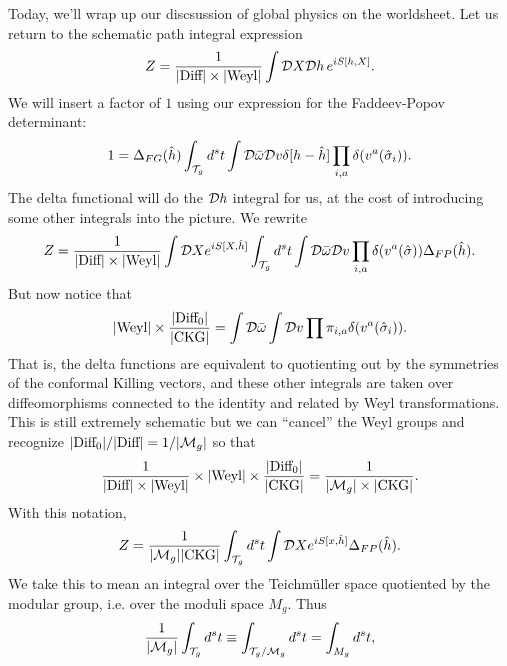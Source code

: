 Today, we'll wrap up our discsussion of global physics on the worldsheet. Let us return to the schematic path integral expression
\begin{equation}
    Z=\frac{1}{\lvert\text{Diff}\rvert \times \lvert\text{Weyl}\rvert} \int \mathcal{D} X \mathcal{D} h \, e^{iS[h,X]}.
\end{equation}
We will insert a factor of $1$ using our expression for the Faddeev-Popov determinant:
\begin{equation}
    1=\Delta_{FG}(\hat h) \int_{\mathcal{T}_g} d^s t \int \mathcal{D} \bar \omega \mathcal{D} v \delta[h-\hat h] \prod_{i,a} \delta(v^a (\hat \sigma_i)).
\end{equation}
The delta functional will do the $\mathcal{D} h$ integral for us, at the cost of introducing some other integrals into the picture. We rewrite
\begin{equation}
    Z=\frac{1}{\lvert\text{Diff}\rvert \times \lvert\text{Weyl}\rvert} \int \mathcal{D} X e^{iS[X,\hat h]} \int_{\mathcal{T}_g} d^st \int \mathcal{D} \bar \omega \mathcal{D} v \prod_{i,a} \delta(v^a (\hat \sigma)) \Delta_{FP}(\hat h).
\end{equation}
But now notice that
\begin{equation*}
    \lvert\text{Weyl}\rvert\times \frac{\lvert\text{Diff}_0\rvert}{\lvert\text{CKG}\rvert}=\int \mathcal{D} \bar \omega \int \mathcal{D} v \prod \pi_{i,a} \delta(v^a (\hat \sigma_i)).
\end{equation*}
That is, the delta functions are equivalent to quotienting out by the symmetries of the conformal Killing vectors, and these other integrals are taken over diffeomorphisms connected to the identity and related by Weyl transformations. This is still extremely schematic but we can ``cancel'' the Weyl groups and recognize $\lvert\text{Diff}_0\rvert/\lvert\text{Diff}\rvert=1/\lvert\mathcal{M}_g\rvert$ so that
\begin{equation}
    \frac{1}{\lvert\text{Diff}\rvert \times \lvert\text{Weyl}\rvert} \times \lvert\text{Weyl}\rvert\times \frac{\lvert\text{Diff}_0\rvert}{\lvert\text{CKG}\rvert}=\frac{1}{\lvert\mathcal{M}_g\rvert\times \lvert\text{CKG}\rvert}.
\end{equation}
With this notation,
\begin{equation}
    Z=\frac{1}{\lvert\mathcal{M}_g\rvert \lvert\text{CKG}\rvert} \int_{\mathcal{T}_g} d^s t \int \mathcal{D} X e^{iS[x,\hat h]} \Delta_{FP}(\hat h).
\end{equation}
We take this to mean an integral over the Teichm\"uller space quotiented by the modular group, i.e. over the moduli space $M_g$. Thus
\begin{equation*}
    \frac{1}{\lvert\mathcal{M}_g\rvert}\int_{\mathcal{T}_g}d^s t \equiv \int_{\mathcal{T}_g/\mathcal{M}_g} d^s t = \int_{M_g} d^s t,
\end{equation*}
